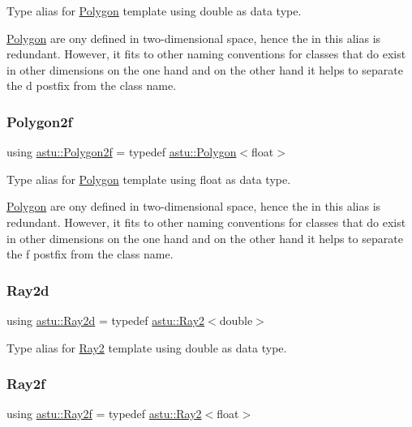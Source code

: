 Type alias for \hyperlink{classastu_1_1Polygon}{Polygon} template using double as data type.

\hyperlink{classastu_1_1Polygon}{Polygon} are ony defined in two-\/dimensional space, hence the {} in this alias is redundant. However, it fits to other naming conventions for classes that do exist in other dimensions on the one hand and on the other hand it helps to separate the {\ttfamily d} postfix from the class name. \mbox{\label{namespaceastu_a39ca0cd425ff5edd2a090d6997ce8c2a}} 
\subsubsection{\texorpdfstring{Polygon2f}{Polygon2f}}
{\footnotesize\ttfamily using \hyperlink{namespaceastu_a39ca0cd425ff5edd2a090d6997ce8c2a}{astu\+::\+Polygon2f} = typedef \hyperlink{classastu_1_1Polygon}{astu\+::\+Polygon}$<$float$>$}

Type alias for \hyperlink{classastu_1_1Polygon}{Polygon} template using float as data type.

\hyperlink{classastu_1_1Polygon}{Polygon} are ony defined in two-\/dimensional space, hence the {} in this alias is redundant. However, it fits to other naming conventions for classes that do exist in other dimensions on the one hand and on the other hand it helps to separate the {\ttfamily f} postfix from the class name. \mbox{\label{namespaceastu_a37ce0df4f800cdda11a64fa7d936a25d}} 
\subsubsection{\texorpdfstring{Ray2d}{Ray2d}}
{\footnotesize\ttfamily using \hyperlink{namespaceastu_a37ce0df4f800cdda11a64fa7d936a25d}{astu\+::\+Ray2d} = typedef \hyperlink{classastu_1_1Ray2}{astu\+::\+Ray2}$<$double$>$}

Type alias for \hyperlink{classastu_1_1Ray2}{Ray2} template using double as data type. \mbox{\label{namespaceastu_aa8986be7101408a7fbfdd07c73ecf8cb}} 
\subsubsection{\texorpdfstring{Ray2f}{Ray2f}}
{\footnotesize\ttfamily using \hyperlink{namespaceastu_aa8986be7101408a7fbfdd07c73ecf8cb}{astu\+::\+Ray2f} = typedef \hyperlink{classastu_1_1Ray2}{astu\+::\+Ray2}$<$float$>$}


